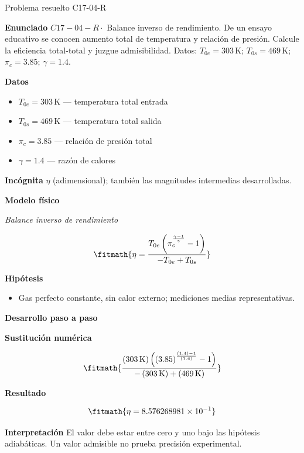 \documentclass[10pt,openany]{book}
\begin{document}
\begin{studiumworked}{Problema resuelto C17-04-R}


\noindent\textbf{Enunciado}
\(C17-04-R \cdot\) Balance inverso de rendimiento. De un ensayo educativo se conocen aumento total de temperatura y relación de presión. Calcule la eficiencia total-total y juzgue admisibilidad. Datos: \(T_{0e}=303\, \mathrm{K}\); \(T_{0s}=469\, \mathrm{K}\); \(\pi_c=3.85\); \(\gamma=1.4\).

\noindent\textbf{Datos}
\begin{itemize}
\item $T_{0e} = 303\,\mathrm{K}$ — temperatura total entrada
\item $T_{0s} = 469\,\mathrm{K}$ — temperatura total salida
\item $\pi_c = 3.85$ — relación de presión total
\item $\gamma = 1.4$ — razón de calores
\end{itemize}

\noindent\textbf{Incógnita}
$\eta$ (adimensional); también las magnitudes intermedias desarrolladas.

\noindent\textbf{Modelo físico}

\noindent\textit{Balance inverso de rendimiento}

\[
\fitmath{\eta=\frac{T_{0e} \left(\pi_c^{\frac{\gamma - 1}{\gamma}} - 1\right)}{- T_{0e} + T_{0s}}}
\]

\noindent\textbf{Hipótesis}
\begin{itemize}
\item Gas perfecto constante, sin calor externo; mediciones medias representativas.
\end{itemize}

\noindent\textbf{Desarrollo paso a paso}



\noindent\textbf{Sustitución numérica}

\[
\fitmath{\frac{\left(303\,\mathrm{K}\right) \left(\left(3.85\right)^{\frac{\left(1.4\right) - 1}{\left(1.4\right)}} - 1\right)}{- \left(303\,\mathrm{K}\right) + \left(469\,\mathrm{K}\right)}}
\]

\noindent\textbf{Resultado}

\[
\fitmath{\eta=8.576268981\times10^{-1}}
\]

\noindent\textbf{Interpretación}
El valor debe estar entre cero y uno bajo las hipótesis adiabáticas. Un valor admisible no prueba precisión experimental.


\end{studiumworked}
\end{document}
